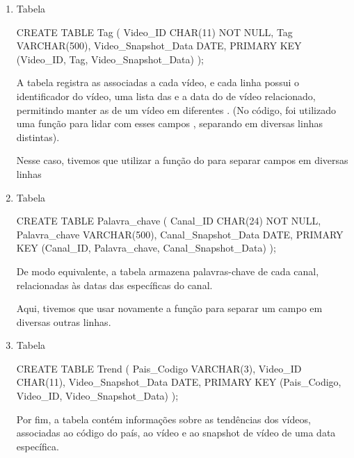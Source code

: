 \begin{enumerate}
    \item Tabela 

    \begin{code}
      CREATE TABLE Tag (
        Video_ID CHAR(11) NOT NULL,
        Tag VARCHAR(500),
        Video_Snapshot_Data DATE,
        PRIMARY KEY (Video_ID, Tag, Video_Snapshot_Data)
      );
    \end{code}

    A tabela  registra as  associadas a cada vídeo, e cada linha possui o identificador do vídeo, uma lista das  e a data do  de vídeo relacionado, permitindo manter as  de um vídeo em diferentes . (No código, foi utilizado uma função para lidar com esses campos , separando em diversas linhas distintas).

    Nesse caso, tivemos que utilizar a função  do  para separar campos  em diversas linhas

    \item Tabela 

    \begin{code}
      CREATE TABLE Palavra_chave (
        Canal_ID CHAR(24) NOT NULL,
        Palavra_chave VARCHAR(500),
        Canal_Snapshot_Data DATE,
        PRIMARY KEY (Canal_ID, Palavra_chave, Canal_Snapshot_Data)
      );
    \end{code}

    De modo equivalente, a tabela  armazena palavras-chave de cada canal, relacionadas às datas das  específicas do canal.

    Aqui, tivemos que usar novamente a função para separar um campo  em diversas outras linhas.

    \item Tabela 

    \begin{code}
      CREATE TABLE Trend (
        Pais_Codigo VARCHAR(3),
        Video_ID CHAR(11),
        Video_Snapshot_Data DATE,
        PRIMARY KEY (Pais_Codigo, Video_ID, Video_Snapshot_Data)
      );
    \end{code}

    Por fim, a tabela  contém informações sobre as tendências dos vídeos, associadas ao código do país, ao vídeo e ao snapshot de vídeo de uma data específica.
  \end{enumerate}

